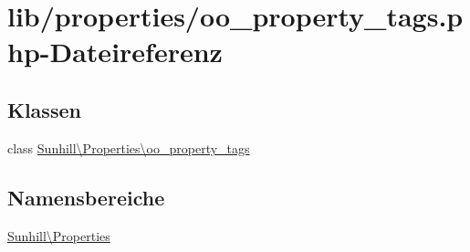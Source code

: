 \hypertarget{oo__property__tags_8php}{}\section{lib/properties/oo\+\_\+property\+\_\+tags.php-\/\+Dateireferenz}
\label{oo__property__tags_8php}
\subsection*{Klassen}
\begin{DoxyCompactItemize}
\item 
class \hyperlink{classSunhill_1_1Properties_1_1oo__property__tags}{Sunhill\textbackslash{}\+Properties\textbackslash{}oo\+\_\+property\+\_\+tags}
\end{DoxyCompactItemize}
\subsection*{Namensbereiche}
\begin{DoxyCompactItemize}
\item 
 \hyperlink{namespaceSunhill_1_1Properties}{Sunhill\textbackslash{}\+Properties}
\end{DoxyCompactItemize}
